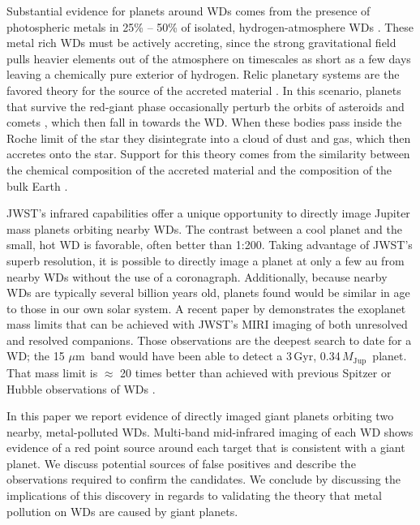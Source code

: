 \documentclass[twocolumn]{aastex631}
\newcommand{\mj}{\,$M_\mathrm{Jup}$}
\newcommand{\um}{\,$\mu$m}
\begin{document}
Substantial evidence for planets around WDs comes from the presence of photospheric metals in 25\% -- 50\% of isolated, hydrogen-atmosphere WDs \citep{Koester2014}. These metal rich WDs must be actively accreting, since the strong gravitational field pulls heavier elements out of the atmosphere on timescales as short as a few days \citep{Koester2009diffusion} leaving a chemically pure exterior of hydrogen. Relic planetary systems are the favored theory for the source of the accreted material \citep{Alcock86, Jura03}. In this scenario, planets that survive the red-giant phase occasionally perturb the orbits of asteroids and comets \citep{DebesWalsh2012}, which then fall in towards the WD. When these bodies pass inside the Roche limit of the star they disintegrate into a cloud of dust and gas, which then accretes onto the star. 
Support for this theory comes from the similarity between the chemical composition of the accreted material and the composition of the bulk Earth \citep[e.g.][]{Melis2011, Xu2019, Trierweiler2023}.

JWST's infrared capabilities offer a unique opportunity to directly image Jupiter mass planets orbiting nearby WDs. The contrast between a cool planet and the small, hot WD is favorable, often better than 1:200.  Taking advantage of JWST's superb resolution, it is possible to directly image a planet at only a few au from nearby WDs without the use of a coronagraph. Additionally, because nearby WDs are typically several billion years old, planets found would be similar in age to those in our own solar system. A recent paper by \citet[][submitted]{Poulsen2023} demonstrates the exoplanet mass limits that can be achieved with JWST's MIRI imaging of both unresolved and resolved companions. Those observations are the deepest search to date for a WD; the 15\,\um\ band would have been able to detect a 3\,Gyr, 0.34\mj\ planet. That mass limit is $\approx$ 20 times better than achieved with previous Spitzer or Hubble observations of WDs \citep{Mullally2007Spitzer, Debes2005}.

In this paper we report evidence of directly imaged giant planets orbiting two nearby, metal-polluted WDs. Multi-band mid-infrared imaging of each WD shows evidence of a red point source around each target that is consistent with a giant planet.  We discuss potential sources of false positives and describe the observations required to confirm the candidates.  We conclude by discussing the implications of this discovery in regards to validating the theory that metal pollution on WDs are caused by giant planets. 
\end{document}

